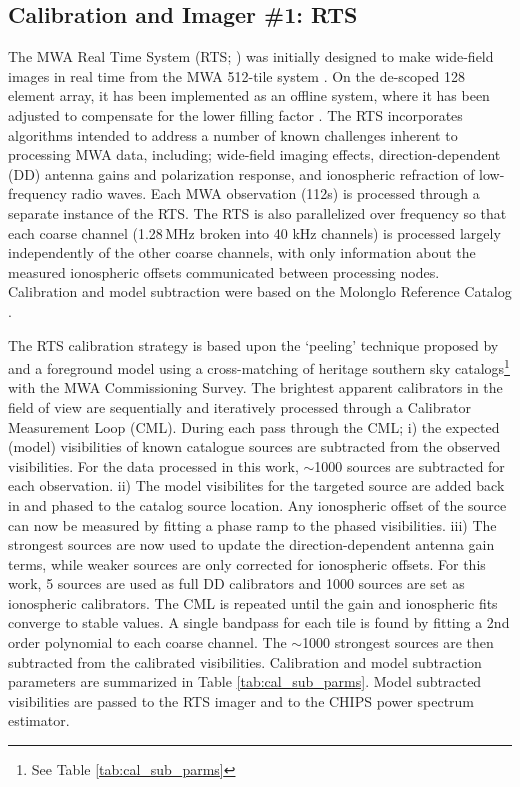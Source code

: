 \documentclass[twolcolumn,iop]{emulateapj}
\begin{document}
\subsection{Calibration and Imager \#1: RTS}
\label{sec:RTS}

The MWA Real Time System (RTS; \cite{Mitchell:2008p707,Ord:2010p8442}) was initially designed to make wide-field images in real time from the MWA 512-tile system \citep{Mitchell:2008p707}.  On the de-scoped 128 element array, it has been implemented as an offline system, where it has been adjusted to compensate for the lower filling factor \citep{Ord:2010p8442}.  The RTS incorporates algorithms intended to address a number of known challenges inherent to processing MWA data, including; wide-field imaging effects, direction-dependent (DD) antenna gains and polarization response, and ionospheric refraction of low-frequency radio waves. Each MWA observation (112s) is processed through a separate instance of the RTS. The RTS is also parallelized over frequency so that each coarse channel (1.28\,MHz broken into 40 kHz channels) is processed largely independently of the other coarse channels, with only information about the measured ionospheric offsets communicated between processing nodes.  Calibration and model subtraction were based on the Molonglo Reference Catalog \citep{Large:1981p7798}. 

The RTS calibration strategy is based upon the `peeling' technique proposed by \cite{Noordam:2004p2379} and a foreground model using a cross-matching of heritage southern sky catalogs\footnote{See Table \ref{tab:cal_sub_parms}} with the MWA Commissioning Survey. The brightest apparent calibrators in the field of view are sequentially and iteratively processed through a Calibrator Measurement Loop (CML). During each pass through the CML; i) the expected (model) visibilities of known catalogue sources are subtracted from the observed visibilities. For the data processed in this work, $\sim$1000 sources are subtracted for each observation. ii) The model visibilites for the targeted source are added back in and phased to the catalog source location. Any ionospheric offset of the source can now be measured by fitting a phase ramp to the phased visibilities. iii) The strongest sources are now used to update the direction-dependent antenna gain terms, while weaker sources are only corrected for ionospheric offsets. For this work, 5 sources are used as full DD calibrators and 1000 sources are set as ionospheric calibrators. The CML is repeated until the gain and ionospheric fits converge to stable values. A single bandpass for each tile is found by fitting a 2nd order polynomial to each coarse channel. The $\sim$1000 strongest sources are then subtracted from the calibrated visibilities.   Calibration and model subtraction parameters are summarized in Table \ref{tab:cal_sub_parms}.  Model subtracted visibilities are passed to the RTS imager and to the CHIPS power spectrum estimator. %
\end{document}

